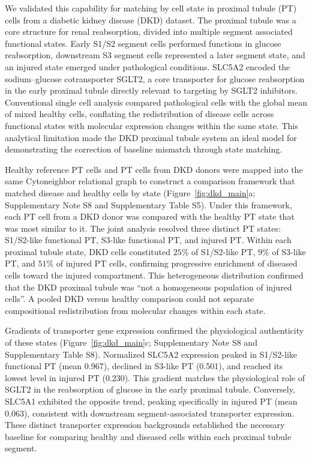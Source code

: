 \documentclass[11pt]{article}
\begin{document}
We validated this capability for matching by cell state in proximal tubule (PT) cells from a diabetic kidney disease (DKD) dataset\cite{Lake2023KidneyAtlas,Muto2021Kidney,Wilson2022DKD}. The proximal tubule was a core structure for renal reabsorption, divided into multiple segment associated functional states\cite{Gerhardt2021PTStates,Chen2023DKDSpatial}. Early S1/S2 segment cells performed functions in glucose reabsorption, downstream S3 segment cells represented a later segment state, and an injured state emerged under pathological conditions. SLC5A2 encoded the sodium--glucose cotransporter SGLT2, a core transporter for glucose reabsorption in the early proximal tubule directly relevant to targeting by SGLT2 inhibitors\cite{Wanner2016EmpaKidney,Perkovic2019CREDENCE,Heerspink2020DAPACKD,Wu2022SGLT2iDKD}. Conventional single cell analysis compared pathological cells with the global mean of mixed healthy cells, conflating the redistribution of disease cells across functional states with molecular expression changes within the same state. This analytical limitation made the DKD proximal tubule system an ideal model for demonstrating the correction of baseline mismatch through state matching.

Healthy reference PT cells and PT cells from DKD donors were mapped into the same Cytoneighbor relational graph to construct a comparison framework that matched disease and healthy cells by state (Figure~\ref{fig:dkd_main}a; Supplementary Note S8 and Supplementary Table S5). Under this framework, each PT cell from a DKD donor was compared with the healthy PT state that was most similar to it. The joint analysis resolved three distinct PT states: S1/S2-like functional PT, S3-like functional PT, and injured PT. Within each proximal tubule state, DKD cells constituted $25\%$ of S1/S2-like PT, $9\%$ of S3-like PT, and $51\%$ of injured PT cells, confirming progressive enrichment of diseased cells toward the injured compartment. This heterogeneous distribution confirmed that the DKD proximal tubule was ``not a homogeneous population of injured cells''. A pooled DKD versus healthy comparison could not separate compositional redistribution from molecular changes within each state.

Gradients of transporter gene expression confirmed the physiological authenticity of these states (Figure~\ref{fig:dkd_main}c; Supplementary Note S8 and Supplementary Table S8). Normalized SLC5A2 expression peaked in S1/S2-like functional PT (mean 0.967), declined in S3-like PT (0.501), and reached its lowest level in injured PT (0.230). This gradient matches the physiological role of SGLT2 in the reabsorption of glucose in the early proximal tubule. Conversely, SLC5A1 exhibited the opposite trend, peaking specifically in injured PT (mean 0.063), consistent with downstream segment-associated transporter expression. These distinct transporter expression backgrounds established the necessary baseline for comparing healthy and diseased cells within each proximal tubule segment.
\end{document}
